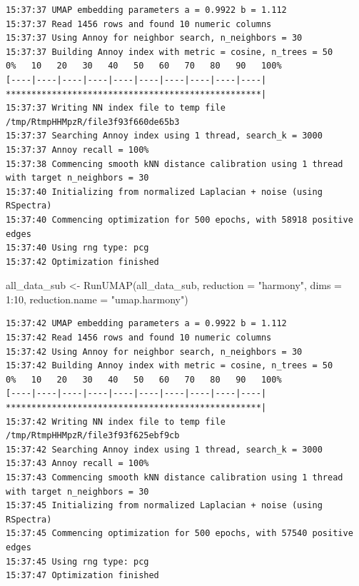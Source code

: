 \documentclass[
  letterpaper,
  DIV=11,
  numbers=noendperiod]{scrreprt}
\newenvironment{Shaded}{\begin{snugshade}}{\end{snugshade}}
\newcommand{\AttributeTok}[1]{\textcolor[rgb]{0.40,0.45,0.13}{#1}}
\newcommand{\DecValTok}[1]{\textcolor[rgb]{0.68,0.00,0.00}{#1}}
\newcommand{\FunctionTok}[1]{\textcolor[rgb]{0.28,0.35,0.67}{#1}}
\newcommand{\NormalTok}[1]{\textcolor[rgb]{0.00,0.23,0.31}{#1}}
\newcommand{\OtherTok}[1]{\textcolor[rgb]{0.00,0.23,0.31}{#1}}
\newcommand{\SpecialCharTok}[1]{\textcolor[rgb]{0.37,0.37,0.37}{#1}}
\newcommand{\StringTok}[1]{\textcolor[rgb]{0.13,0.47,0.30}{#1}}
\begin{document}
\begin{verbatim}
15:37:37 UMAP embedding parameters a = 0.9922 b = 1.112
15:37:37 Read 1456 rows and found 10 numeric columns
15:37:37 Using Annoy for neighbor search, n_neighbors = 30
15:37:37 Building Annoy index with metric = cosine, n_trees = 50
0%   10   20   30   40   50   60   70   80   90   100%
[----|----|----|----|----|----|----|----|----|----|
**************************************************|
15:37:37 Writing NN index file to temp file /tmp/RtmpHHMpzR/file3f93f660de65b3
15:37:37 Searching Annoy index using 1 thread, search_k = 3000
15:37:37 Annoy recall = 100%
15:37:38 Commencing smooth kNN distance calibration using 1 thread with target n_neighbors = 30
15:37:40 Initializing from normalized Laplacian + noise (using RSpectra)
15:37:40 Commencing optimization for 500 epochs, with 58918 positive edges
15:37:40 Using rng type: pcg
15:37:42 Optimization finished
\end{verbatim}

\begin{Shaded}
\begin{Highlighting}[]
\NormalTok{all\_data\_sub }\OtherTok{\textless{}{-}} \FunctionTok{RunUMAP}\NormalTok{(all\_data\_sub, }\AttributeTok{reduction =} \StringTok{"harmony"}\NormalTok{, }\AttributeTok{dims =} \DecValTok{1}\SpecialCharTok{:}\DecValTok{10}\NormalTok{, }\AttributeTok{reduction.name =} \StringTok{"umap.harmony"}\NormalTok{)}
\end{Highlighting}
\end{Shaded}

\begin{verbatim}
15:37:42 UMAP embedding parameters a = 0.9922 b = 1.112
15:37:42 Read 1456 rows and found 10 numeric columns
15:37:42 Using Annoy for neighbor search, n_neighbors = 30
15:37:42 Building Annoy index with metric = cosine, n_trees = 50
0%   10   20   30   40   50   60   70   80   90   100%
[----|----|----|----|----|----|----|----|----|----|
**************************************************|
15:37:42 Writing NN index file to temp file /tmp/RtmpHHMpzR/file3f93f625ebf9cb
15:37:42 Searching Annoy index using 1 thread, search_k = 3000
15:37:43 Annoy recall = 100%
15:37:43 Commencing smooth kNN distance calibration using 1 thread with target n_neighbors = 30
15:37:45 Initializing from normalized Laplacian + noise (using RSpectra)
15:37:45 Commencing optimization for 500 epochs, with 57540 positive edges
15:37:45 Using rng type: pcg
15:37:47 Optimization finished
\end{verbatim}
\end{document}
